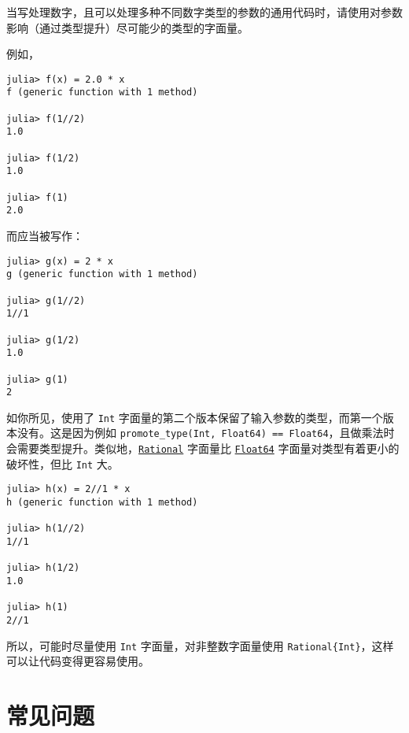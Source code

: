当写处理数字，且可以处理多种不同数字类型的参数的通用代码时，请使用对参数影响（通过类型提升）尽可能少的类型的字面量。



例如，




\begin{verbatim}
julia> f(x) = 2.0 * x
f (generic function with 1 method)

julia> f(1//2)
1.0

julia> f(1/2)
1.0

julia> f(1)
2.0
\end{verbatim}



而应当被写作：




\begin{verbatim}
julia> g(x) = 2 * x
g (generic function with 1 method)

julia> g(1//2)
1//1

julia> g(1/2)
1.0

julia> g(1)
2
\end{verbatim}



如你所见，使用了 \texttt{Int} 字面量的第二个版本保留了输入参数的类型，而第一个版本没有。这是因为例如 \texttt{promote\_type(Int, Float64) == Float64}，且做乘法时会需要类型提升。类似地，\hyperlink{8304566144531167610}{\texttt{Rational}} 字面量比 \hyperlink{5027751419500983000}{\texttt{Float64}} 字面量对类型有着更小的破坏性，但比 \texttt{Int} 大。




\begin{verbatim}
julia> h(x) = 2//1 * x
h (generic function with 1 method)

julia> h(1//2)
1//1

julia> h(1/2)
1.0

julia> h(1)
2//1
\end{verbatim}



所以，可能时尽量使用 \texttt{Int} 字面量，对非整数字面量使用 \texttt{Rational\{Int\}}，这样可以让代码变得更容易使用。



\hypertarget{17031291324185486008}{}


\chapter{常见问题}



